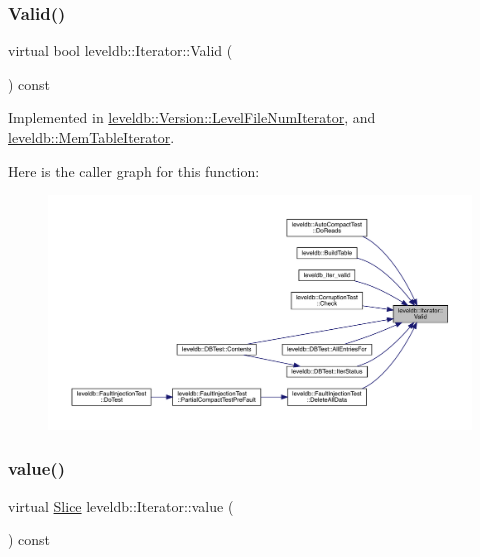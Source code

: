 \subsubsection{\texorpdfstring{Valid()}{Valid()}}
{\footnotesize\ttfamily virtual bool leveldb\+::\+Iterator\+::\+Valid (\begin{DoxyParamCaption}{ }\end{DoxyParamCaption}) const\hspace{0.3cm}{\ttfamily [pure virtual]}}



Implemented in \mbox{\hyperlink{classleveldb_1_1_version_1_1_level_file_num_iterator_a9bf0e045961ed325d37bfaa8b2c77e8b}{leveldb\+::\+Version\+::\+Level\+File\+Num\+Iterator}}, and \mbox{\hyperlink{classleveldb_1_1_mem_table_iterator_ab991decbbda3c3c76dbc1e3cce446b90}{leveldb\+::\+Mem\+Table\+Iterator}}.

Here is the caller graph for this function\+:
\nopagebreak
\begin{figure}[H]
\begin{center}
\leavevmode
\includegraphics[width=350pt]{classleveldb_1_1_iterator_a38614978bfa0586327b8e237bcb46012_icgraph}
\end{center}
\end{figure}
\mbox{\label{classleveldb_1_1_iterator_a613ac2e965518aad7a064c64c72bcf7c}} 
\subsubsection{\texorpdfstring{value()}{value()}}
{\footnotesize\ttfamily virtual \mbox{\hyperlink{classleveldb_1_1_slice}{Slice}} leveldb\+::\+Iterator\+::value (\begin{DoxyParamCaption}{ }\end{DoxyParamCaption}) const\hspace{0.3cm}{\ttfamily [pure virtual]}}



